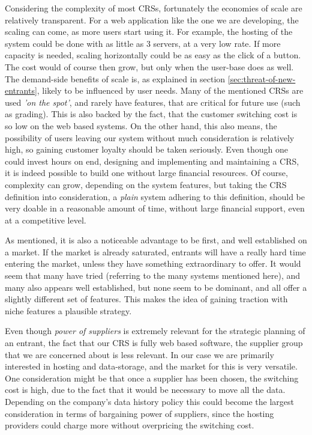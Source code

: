 Considering the complexity of most CRSs, fortunately the economies of scale are relatively transparent. For a web application like the one we are developing, the scaling can come, as more users start using it. For example, the hosting of the system could be done with as little as 3 servers, at a very low rate. If more capacity is needed, scaling horizontally could be as easy as the click of a button. The cost would of course then grow, but only when the user-base does as well.
The demand-side benefits of scale is, as explained in section \ref{sec:threat-of-new-entrants}, likely to be influenced by user needs. Many of the mentioned CRSs are used \emph{'on the spot'}, and rarely have features, that are critical for future use (such as grading). This is also backed by the fact, that the customer switching cost is so low on the web based systems. On the other hand, this also means, the possibility of users leaving our system without much consideration is relatively high, so gaining customer loyalty should be taken seriously.
Even though one could invest hours on end, designing and implementing and maintaining a CRS, it is indeed possible to build one without large financial resources. Of course, complexity can grow, depending on the system features, but taking the CRS definition into consideration, a \emph{plain} system adhering to this definition, should be very doable in a reasonable amount of time, without large financial support, even at a competitive level.

As mentioned, it is also a noticeable advantage to be first, and well established on a market. If the market is already saturated, entrants will have a really hard time entering the market, unless they have something extraordinary to offer. It would seem that many have tried (referring to the many systems mentioned here), and many also appears well established, but none seem to be dominant, and all offer a slightly different set of features. This makes the idea of gaining traction with niche features a plausible strategy.

Even though \emph{power of suppliers} is extremely relevant for the strategic planning of an entrant, the fact that our CRS is fully web based software, the supplier group that we are concerned about is less relevant. In our case we are primarily interested in hosting and data-storage, and the market for this is very versatile. One consideration might be that once a supplier has been chosen, the switching cost is high, due to the fact that it would be necessary to move all the data. Depending on the company's data history policy this could become the largest consideration in terms of bargaining power of suppliers, since the hosting providers could charge more without overpricing the switching cost.


